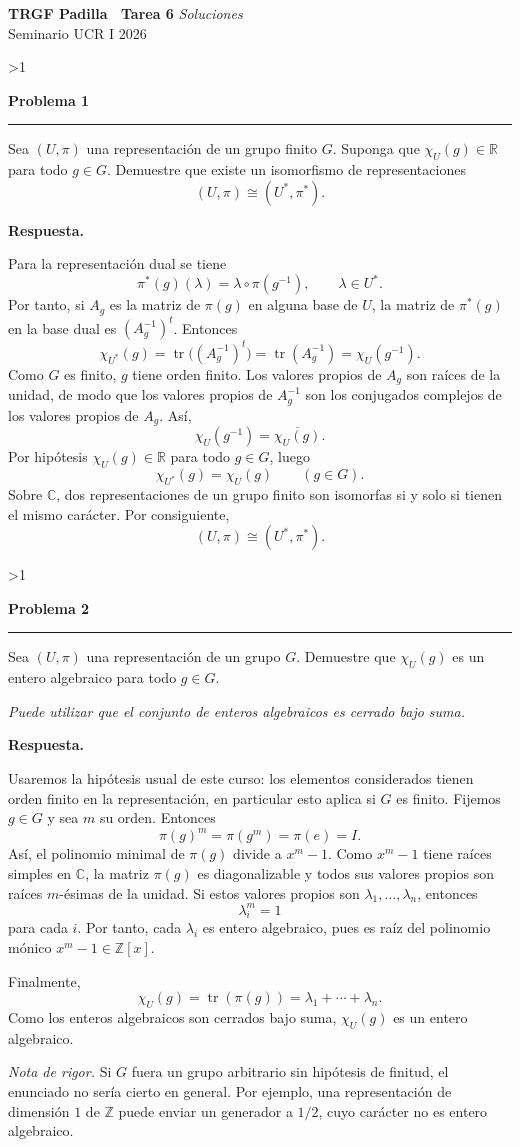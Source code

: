 \documentclass[10pt,a4paper]{article}
\newcommand{\CC}{\mathbb{C}}
\newcommand{\RR}{\mathbb{R}}
\newcommand{\inlinehead}[2][repblue]{%
  \par\smallskip
  {\color{#1}\bfseries #2.}\hspace{0.45em}%
}
\newcommand{\answer}{\inlinehead{Respuesta}}
\newcommand{\topbanner}{%
  \begin{tcolorbox}[
    colback=replight,
    colframe=repline,
    borderline west={1.2pt}{0pt}{repblue},
    borderline east={1.2pt}{0pt}{repteal},
    left=1.0em,
    right=1.0em,
    top=0.7em,
    bottom=0.55em
  ]
    {\Large\bfseries\color{repblue} TRGF Padilla \textemdash\ Tarea 6}\hfill
    {\color{repaccent}\small\itshape Soluciones}\\[-0.1em]
    {\normalsize\color{repteal} Seminario UCR I 2026}
  \end{tcolorbox}
}
\newcounter{probcnt}
\newcommand{\problem}[2]{%
  \stepcounter{probcnt}%
  \ifnum\value{probcnt}>1\newpage\fi
  \par\vspace{0.25em}
  {\large\bfseries\color{repblue} Problema #1}\par
  {\color{repline}\rule{\linewidth}{0.55pt}}\par
  \begin{tcolorbox}[
    breakable,
    colback=white,
    colframe=repline,
    borderline west={1.6pt}{0pt}{repteal},
    left=0.7em,
    right=0.7em,
    top=0.35em,
    bottom=0.3em,
    before skip=0.35em,
    after skip=0.45em
  ]
    #2
  \end{tcolorbox}
}
\begin{document}
\color{black}
\topbanner
\small

\problem{1}{%
Sea $(U,\pi)$ una representación de un grupo finito $G$. Suponga que $\chi_U(g) \in \RR$
para todo $g \in G$. Demuestre que existe un isomorfismo de representaciones
\[
  (U,\pi) \cong (U^*, \pi^*).
\]
}

\answer
Para la representación dual se tiene
\[
  \pi^*(g)(\lambda)=\lambda\circ \pi(g^{-1}),
  \qquad \lambda\in U^*.
\]
Por tanto, si $A_g$ es la matriz de $\pi(g)$ en alguna base de $U$, la matriz de
$\pi^*(g)$ en la base dual es $(A_g^{-1})^t$. Entonces
\[
  \chi_{U^*}(g)=\operatorname{tr}\bigl((A_g^{-1})^t\bigr)
  =\operatorname{tr}(A_g^{-1})=\chi_U(g^{-1}).
\]
Como $G$ es finito, $g$ tiene orden finito. Los valores propios de $A_g$ son raíces de
la unidad, de modo que los valores propios de $A_g^{-1}$ son los conjugados complejos de
los valores propios de $A_g$. Así,
\[
  \chi_U(g^{-1})=\overline{\chi_U(g)}.
\]
Por hipótesis $\chi_U(g)\in\RR$ para todo $g\in G$, luego
\[
  \chi_{U^*}(g)=\chi_U(g)
  \qquad (g\in G).
\]
Sobre $\CC$, dos representaciones de un grupo finito son isomorfas si y solo si tienen
el mismo carácter. Por consiguiente,
\[
  (U,\pi)\cong (U^*,\pi^*).
\]

\problem{2}{%
Sea $(U,\pi)$ una representación de un grupo $G$. Demuestre que $\chi_U(g)$ es un entero
algebraico para todo $g \in G$.

\smallskip
\textit{Puede utilizar que el conjunto de enteros algebraicos es cerrado bajo suma.}
}

\answer
Usaremos la hipótesis usual de este curso: los elementos considerados tienen orden finito
en la representación, en particular esto aplica si $G$ es finito. Fijemos $g\in G$ y sea
$m$ su orden. Entonces
\[
  \pi(g)^m=\pi(g^m)=\pi(e)=I.
\]
Así, el polinomio minimal de $\pi(g)$ divide a $x^m-1$. Como $x^m-1$ tiene raíces simples
en $\CC$, la matriz $\pi(g)$ es diagonalizable y todos sus valores propios son raíces
$m$-ésimas de la unidad. Si estos valores propios son $\lambda_1,\dots,\lambda_n$, entonces
\[
  \lambda_i^m=1
\]
para cada $i$. Por tanto, cada $\lambda_i$ es entero algebraico, pues es raíz del polinomio
mónico $x^m-1\in\mathbb Z[x]$.

Finalmente,
\[
  \chi_U(g)=\operatorname{tr}(\pi(g))=\lambda_1+\cdots+\lambda_n.
\]
Como los enteros algebraicos son cerrados bajo suma, $\chi_U(g)$ es un entero algebraico.

\smallskip
\textit{Nota de rigor.} Si $G$ fuera un grupo arbitrario sin hipótesis de finitud, el
enunciado no sería cierto en general. Por ejemplo, una representación de dimensión $1$ de
\(\mathbb Z\) puede enviar un generador a $1/2$, cuyo carácter no es entero algebraico.
\end{document}
